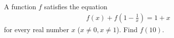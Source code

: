 A function $f$ satisfies the equation 
\begin{align*}
f(x) + f\left(1-\frac{1}{x}\right) = 1 + x
\end{align*}
for every real number $x$ ($x \neq 0, x \neq 1$). Find $f(10)$.